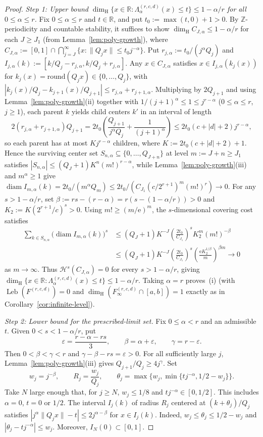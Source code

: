 \documentclass[11pt]{article}
\theoremstyle{definition}
\theoremstyle{remark}
\newcommand{\R}{\mathbb{R}}
\newcommand{\Z}{\mathbb{Z}}
\newcommand{\ee}{\mathrm{e}}
\newcommand{\dimH}{\dim_{\mathrm{H}}}
\newcommand{\Lam}{\Lambda}
\begin{document}
\begin{proof}
\emph{Step 1: Upper bound $\dimH\{x\in\R:\Lam_\alpha^{(r,c,d)}(x)\le t\}\le1-\alpha/r$
for all $0\le\alpha\le r$.} Fix $0\le\alpha\le r$ and $t\in\R$, and put
$t_0:=\max(t,0)+1>0$. By $\Z$-periodicity and countable stability, it suffices to
show $\dimH C_{J,\alpha}\le1-\alpha/r$ for each $J\ge J_1$ (from
Lemma~\ref{lem:poly-growth}), where
$C_{J,\alpha}:=[0,1]\cap\bigcap_{j=J}^\infty\{x:\|Q_jx\|\le t_0j^{-\alpha}\}$.
Put $r_{j,\alpha}:=t_0/(j^\alpha Q_j)$ and
$I_{j,\alpha}(k):=[k/Q_j-r_{j,\alpha},k/Q_j+r_{j,\alpha}]$. Any $x\in C_{J,\alpha}$
satisfies $x\in I_{j,\alpha}(k_j(x))$ for $k_j(x)=\mathrm{round}(Q_jx)\in\{0,\dots,Q_j\}$,
with $|k_j(x)/Q_j-k_{j+1}(x)/Q_{j+1}|\le r_{j,\alpha}+r_{j+1,\alpha}$. Multiplying
by $2Q_{j+1}$ and using Lemma~\ref{lem:poly-growth}(ii) together with
$1/(j+1)^\alpha\le1\le j^{r-\alpha}$ ($0\le\alpha\le r$, $j\ge1$), each parent
$k$ yields child centers $k'$ in an interval of length
\[
2(r_{j,\alpha}+r_{j+1,\alpha})Q_{j+1}
=2t_0\left(\frac{Q_{j+1}}{j^\alpha Q_j}+\frac{1}{(j+1)^\alpha}\right)
\le 2t_0(c+|d|+2)j^{r-\alpha},
\]
so each parent has at most $Kj^{r-\alpha}$ children, where $K:=2t_0(c+|d|+2)+1$.
Hence the surviving center set $S_{n,\alpha}\subseteq\{0,\dots,Q_{J+n}\}$ at
level $m:=J+n\ge J_1$ satisfies
$|S_{n,\alpha}|\le(Q_J+1)K^n(m!)^{r-\alpha}$, while
Lemma~\ref{lem:poly-growth}(iii) and $m^\alpha\ge1$ give
$\operatorname{diam}I_{m,\alpha}(k)=2t_0/(m^\alpha Q_m)\le2t_0/(C_{J_1}(c/2^{r+1})^m(m!)^r)\to0$.
For any $s>1-\alpha/r$, set $\beta:=rs-(r-\alpha)=r(s-(1-\alpha/r))>0$ and
$K_2:=K(2^{r+1}/c)^s>0$. Using $m!\ge(m/\ee)^m$, the $s$-dimensional covering
cost satisfies
\begin{align*}
\sum_{k\in S_{n,\alpha}}\bigl(\operatorname{diam}I_{m,\alpha}(k)\bigr)^s
&\le(Q_J+1)K^{-J}\left(\frac{2t_0}{C_{J_1}}\right)^s K_2^m(m!)^{-\beta}\\
&\le(Q_J+1)K^{-J}\left(\frac{2t_0}{C_{J_1}}\right)^s
\left(\frac{\ee K_2^{1/\beta}}{m}\right)^{\beta m}\longrightarrow0
\end{align*}
as $m\to\infty$. Thus $\mathcal H^s(C_{J,\alpha})=0$ for every $s>1-\alpha/r$,
giving $\dimH\{x\in\R:\Lam_\alpha^{(r,c,d)}(x)\le t\}\le1-\alpha/r$. Taking
$\alpha=r$ proves~(i) (with $\operatorname{Leb}(F^{(r,c,d)})=0$ and
$\dimH(F_\infty^{(r,c,d)}\cap[a,b])=1$ exactly as in Corollary~\ref{cor:infinite-level}).

\emph{Step 2: Lower bound for the prescribed-limit set.}
Fix $0\le\alpha<r$ and an admissible $t$. Given $0<s<1-\alpha/r$, put
\[
  \varepsilon=\frac{r-\alpha-rs}{3},\qquad
  \beta=\alpha+\varepsilon,\qquad \gamma=r-\varepsilon .
\]
Then $0<\beta<\gamma<r$ and $\gamma-\beta-rs=\varepsilon>0$.
For all sufficiently large $j$, Lemma~\ref{lem:poly-growth}(iii) gives
$Q_{j+1}/Q_j\ge 4j^\gamma$. Set
\[
  w_j=j^{-\beta},\qquad R_j=\frac{w_j}{Q_j},\qquad
  \theta_j=\max\{w_j,\min\{tj^{-\alpha},1/2-w_j\}\}.
\]
Take $N$ large enough that, for $j\ge N$, $w_j\le1/8$ and
$tj^{-\alpha}\in[0,1/2]$. This includes $\alpha=0$, $t=0$ or $1/2$.
The interval $I_j(k)$ of radius $R_j$ centered at $(k+\theta_j)/Q_j$
satisfies $|j^\alpha\|Q_jx\|-t|\le2j^{\alpha-\beta}$ for $x\in I_j(k)$.
Indeed, $w_j\le\theta_j\le1/2-w_j$ and
$|\theta_j-tj^{-\alpha}|\le w_j$. Moreover, $I_N(0)\subset[0,1]$.


\end{proof}
\end{document}
